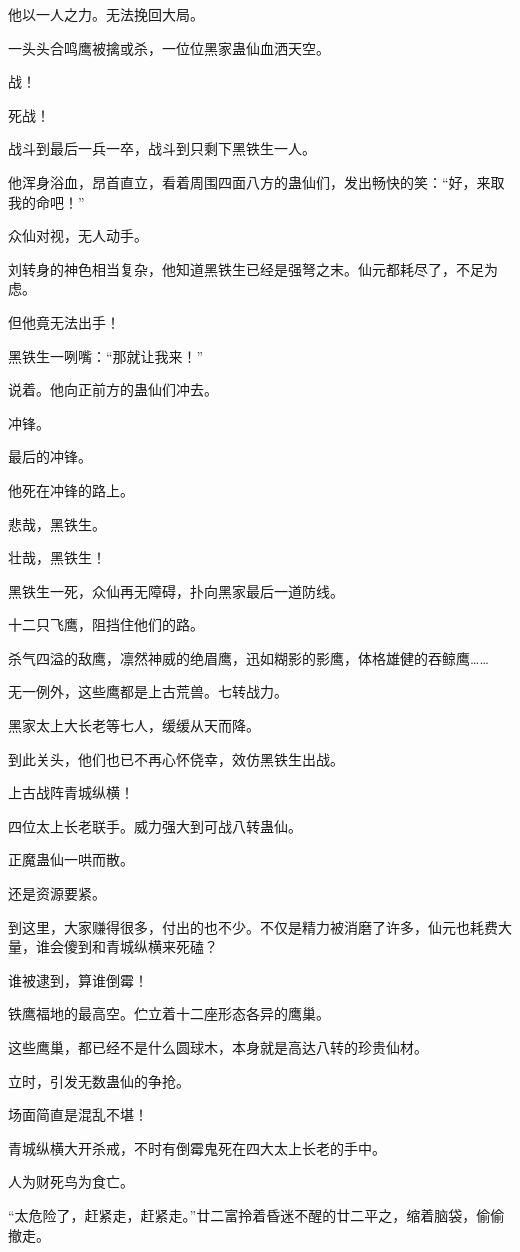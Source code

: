 \begin{this_body}
他以一人之力。无法挽回大局。

一头头合鸣鹰被擒或杀，一位位黑家蛊仙血洒天空。

战！

死战！

战斗到最后一兵一卒，战斗到只剩下黑铁生一人。

他浑身浴血，昂首直立，看着周围四面八方的蛊仙们，发出畅快的笑：“好，来取我的命吧！”

众仙对视，无人动手。

刘转身的神色相当复杂，他知道黑铁生已经是强弩之末。仙元都耗尽了，不足为虑。

但他竟无法出手！

黑铁生一咧嘴：“那就让我来！”

说着。他向正前方的蛊仙们冲去。

冲锋。

最后的冲锋。

他死在冲锋的路上。

悲哉，黑铁生。

壮哉，黑铁生！

黑铁生一死，众仙再无障碍，扑向黑家最后一道防线。

十二只飞鹰，阻挡住他们的路。

杀气四溢的敌鹰，凛然神威的绝眉鹰，迅如糊影的影鹰，体格雄健的吞鲸鹰……

无一例外，这些鹰都是上古荒兽。七转战力。

黑家太上大长老等七人，缓缓从天而降。

到此关头，他们也已不再心怀侥幸，效仿黑铁生出战。

上古战阵青城纵横！

四位太上长老联手。威力强大到可战八转蛊仙。

正魔蛊仙一哄而散。

还是资源要紧。

到这里，大家赚得很多，付出的也不少。不仅是精力被消磨了许多，仙元也耗费大量，谁会傻到和青城纵横来死磕？

谁被逮到，算谁倒霉！

铁鹰福地的最高空。伫立着十二座形态各异的鹰巢。

这些鹰巢，都已经不是什么圆球木，本身就是高达八转的珍贵仙材。

立时，引发无数蛊仙的争抢。

场面简直是混乱不堪！

青城纵横大开杀戒，不时有倒霉鬼死在四大太上长老的手中。

人为财死鸟为食亡。

“太危险了，赶紧走，赶紧走。”廿二富拎着昏迷不醒的廿二平之，缩着脑袋，偷偷撤走。


\end{this_body}
